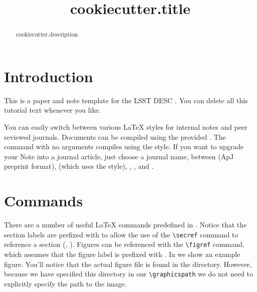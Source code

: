 \documentclass[\docopts]{\docclass}
\begin{document}
\title{ {{ cookiecutter.title }} }

\maketitlepre

\begin{abstract}

{{ cookiecutter.description }}

\end{abstract}


\maketitlepost


\section{Introduction}
\label{sec:intro}

This is a paper and note template for the LSST DESC \citep{Overview,ScienceBook,WhitePaper}.
You can delete all this tutorial text whenever you like.

You can easily switch between various \LaTeX\xspace styles for internal notes and peer reviewed journals.
Documents can be compiled using the provided .
The command  with no arguments compiles  using the   style.
If you want to upgrade your Note into a journal article, just choose a journal name, between  (ApJ preprint format),  (which uses the  style), , , and .



\section{Commands}
\label{sec:commands}

There are a number of useful \LaTeX\xspace commands predefined in .
Notice that the section labels are prefixed with  to allow the use of the \verb=\secref= command to reference a section (\ie, ).
Figures can be referenced with the \verb=\figref= command, which assumes that the figure label is prefixed with .
In  we show an example figure.
You'll notice that the actual figure file is found in the  directory.
However, because we have specified this directory in our \verb=\graphicspath= we do not need to explicitly specify the path to the image.
\end{document}
